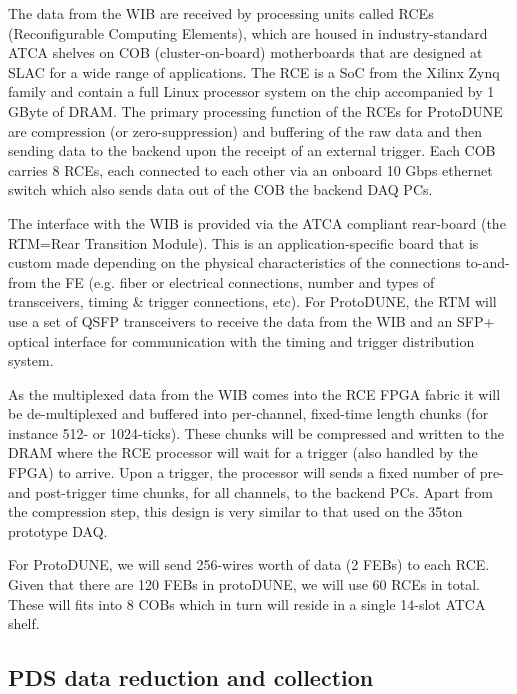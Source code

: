 The data from the WIB are received by processing units called RCEs
(Reconfigurable Computing Elements), which are housed in industry-standard
ATCA shelves on COB (cluster-on-board) motherboards that are designed
at SLAC for a wide range of applications.   The RCE is a SoC from the
Xilinx Zynq family and contain a full Linux processor system on the chip
accompanied by 1 GByte of DRAM.   The primary processing function of the
RCEs for ProtoDUNE are compression (or zero-suppression) and buffering
of the raw data and then sending data to the backend upon the receipt of
an external trigger.  Each COB carries 8 RCEs, each connected to each
other via an onboard 10 Gbps ethernet switch which also sends data out
of the COB the backend DAQ PCs.

The interface with the WIB is provided via the ATCA compliant rear-board
(the RTM=Rear Transition Module).  This is an application-specific board
that is custom made depending on the physical characteristics of the
connections to-and-from the FE (e.g. fiber or electrical connections,
number and types of transceivers, timing \& trigger connections, etc).
For ProtoDUNE, the RTM will use a set of QSFP transceivers to receive
the data from the WIB and an SFP+ optical interface for communication
with the timing and trigger distribution system.

As the multiplexed data from the WIB comes into the RCE FPGA fabric
it will be de-multiplexed and buffered into per-channel, fixed-time
length chunks (for instance 512- or 1024-ticks).  These chunks will be
compressed and written to the DRAM where the RCE processor will wait
for a trigger (also handled by the FPGA) to arrive.  Upon a trigger, the
processor will sends a fixed number of pre- and post-trigger time chunks,
for all channels, to the backend PCs.  Apart from the compression step,
this design is very similar to that used on the 35ton prototype DAQ.

For ProtoDUNE, we will send 256-wires worth of data (2 FEBs) to each RCE.
Given that there are 120 FEBs in protoDUNE, we will use 60 RCEs in total.
These will fits into 8 COBs which in turn will reside in a single 14-slot
ATCA shelf.



\subsection{PDS data reduction and collection}


